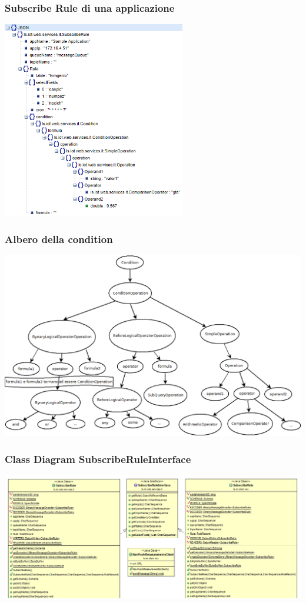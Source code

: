 \documentclass{beamer}
\begin{document}
\begin{frame}
\frametitle{Subscribe Rule di una applicazione}
\includegraphics[width=0.6\textwidth]{images/subscribe-json-1.png}
\end{frame}

\begin{frame}
\frametitle{Albero della condition}
\includegraphics[width=1\textwidth]{images/strutturaquerytree.png}
\end{frame}

\begin{frame}
\frametitle{Class Diagram SubscribeRuleInterface}
\includegraphics[width=1\textwidth]{images/figura10.png}
\end{frame}
\end{document}

